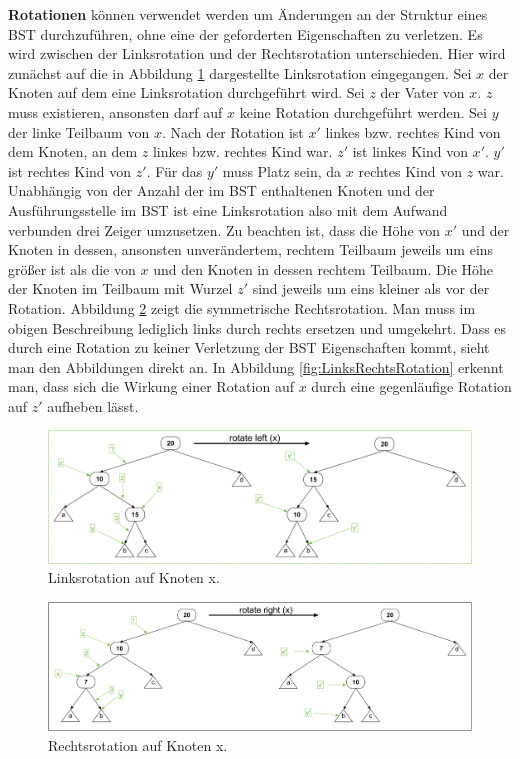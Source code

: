 \documentclass[a4paper,12pt]{article}
\begin{document}
\noindent\textbf{Rotationen} können verwendet werden um Änderungen an der Struktur eines BST durchzuführen, ohne eine der geforderten Eigenschaften zu verletzen. Es wird zwischen der Linksrotation und der Rechtsrotation 
unterschieden. Hier wird zunächst auf die in Abbildung \ref{fig:Linksrotation} dargestellte Linksrotation eingegangen. 
Sei $x$ der Knoten auf dem eine Linksrotation durchgeführt wird. Sei $z$ der Vater von $x$. $z$ muss existieren, ansonsten darf auf $x$ keine Rotation durchgeführt werden. Sei $y$ der linke Teilbaum von $x$. Nach der Rotation ist $x'$ linkes bzw. rechtes Kind von dem Knoten, an dem $z$ linkes bzw. rechtes Kind war. $z'$ ist linkes Kind von $x'$. $y'$ ist rechtes Kind von $z'$. Für das $y'$ muss Platz sein, da $x$ rechtes Kind von $z$ war. Unabhängig von der Anzahl der im BST enthaltenen Knoten und der Ausführungsstelle im BST ist eine Linksrotation also mit dem Aufwand verbunden drei Zeiger umzusetzen. Zu beachten ist, dass die Höhe von $x'$ und der Knoten in dessen, ansonsten unverändertem, rechtem Teilbaum jeweils um eins größer ist als die von $x$ und den Knoten in dessen rechtem Teilbaum. Die Höhe der Knoten im Teilbaum mit Wurzel $z'$ sind jeweils um eins kleiner als vor der Rotation.
 Abbildung \ref{fig:Rechtsrotation} zeigt die symmetrische Rechtsrotation. Man muss im obigen Beschreibung lediglich links durch rechts ersetzen und umgekehrt. Dass es durch eine Rotation zu keiner Verletzung der BST Eigenschaften kommt, sieht man den Abbildungen direkt an. In Abbildung \ref{fig:LinksRechtsRotation} erkennt man, dass sich die Wirkung einer Rotation auf $x$ durch eine gegenläufige Rotation auf $z'$ aufheben lässt.  
\begin{figure}[h]
	\centering
	\includegraphics[width= 1.2\textwidth]{"Medien/Einleitung/Linksrotation"}
	\caption{Linksrotation auf Knoten x. }
	\label{fig:Linksrotation}
\end{figure}
\begin{figure}[h]
	\centering
	\includegraphics[width= 1.2\textwidth]{"Medien/Einleitung/Rechtsrotation"}
	\caption{Rechtsrotation auf Knoten x. }
	\label{fig:Rechtsrotation}
\end{figure}
\end{document}
